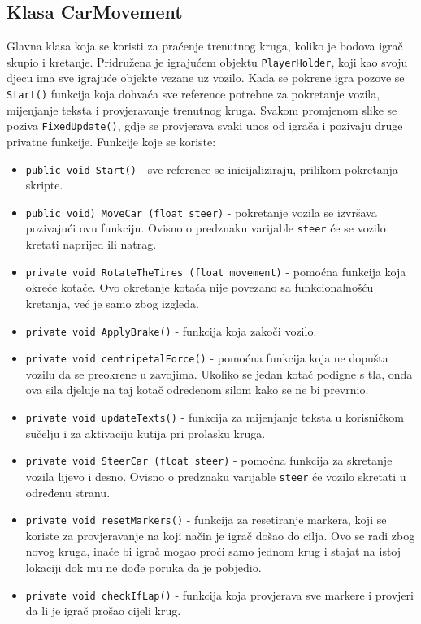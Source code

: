 \subsection{Klasa CarMovement}
Glavna klasa koja se koristi za praćenje trenutnog kruga, koliko je bodova igrač skupio i kretanje. Pridružena je igrajućem objektu \texttt{PlayerHolder}, koji kao svoju djecu ima sve igrajuće objekte vezane uz vozilo. Kada se pokrene igra pozove se \texttt{Start()} funkcija koja dohvaća sve reference potrebne za pokretanje vozila, mijenjanje teksta i provjeravanje trenutnog kruga. Svakom promjenom slike se poziva \texttt{FixedUpdate()}, gdje se provjerava svaki unos od igrača i pozivaju druge privatne funkcije. Funkcije koje se koriste:
\begin{itemize}
	\item \texttt{public void Start()} - sve reference se inicijaliziraju, prilikom pokretanja skripte.
	\item \texttt{public void) MoveCar (float steer)} - pokretanje vozila se izvršava pozivajući ovu funkciju. Ovisno o predznaku varijable \texttt{steer} će se vozilo kretati naprijed ili natrag.
	\item \texttt{private void RotateTheTires (float movement)} - pomoćna funkcija koja okreće kotače. Ovo okretanje kotača nije povezano sa funkcionalnošću kretanja, već je samo zbog izgleda.
	\item \texttt{private void ApplyBrake()} - funkcija koja zakoči vozilo.
	\item \texttt{private void centripetalForce()} - pomoćna funkcija koja ne dopušta vozilu da se preokrene u zavojima. Ukoliko se jedan kotač podigne s tla, onda ova sila djeluje na taj kotač određenom silom kako se ne bi prevrnio.
	\item \texttt{private void updateTexts()} - funkcija za mijenjanje teksta u korisničkom sučelju i za aktivaciju kutija pri prolasku kruga.
	\item \texttt{private void SteerCar (float steer)} - pomoćna funkcija za skretanje vozila lijevo i desno. Ovisno o predznaku varijable \texttt{steer} će vozilo skretati u određenu stranu.
	\item \texttt{private void resetMarkers()} - funkcija za resetiranje markera, koji se koriste za provjeravanje na koji način je igrač došao do cilja. Ovo se radi zbog novog kruga, inače bi igrač mogao proći samo jednom krug i stajat na istoj lokaciji dok mu ne dođe poruka da je pobjedio.
	\item \texttt{private void checkIfLap()} - funkcija koja provjerava sve markere i provjeri da li je igrač prošao cijeli krug.

\end{itemize}

